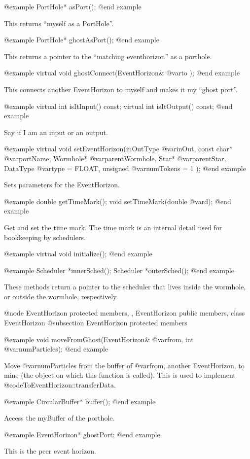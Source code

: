 @example
PortHole* asPort();
@end example

This returns ``myself as a PortHole''.

@example
PortHole* ghostAsPort();
@end example

This returns a pointer to the ``matching eventhorizon'' as a porthole.

@example
virtual void ghostConnect(EventHorizon& @var{to} );
@end example

This connects another EventHorizon to myself and makes it my ``ghost
port''.

@example
virtual int isItInput() const;
virtual int isItOutput() const;
@end example

Say if I am an input or an output.

@example
virtual void setEventHorizon(inOutType @var{inOut}, const char* @var{portName},
     Wormhole* @var{parentWormhole}, Star* @var{parentStar},
     DataType @var{type} = FLOAT, unsigned @var{numTokens} = 1 );
@end example

Sets parameters for the EventHorizon.

@example
double getTimeMark();
void setTimeMark(double @var{d});
@end example

Get and set the time mark.  The time mark is an internal detail used for
bookkeeping by schedulers.

@example
virtual void initialize();
@end example

@example
Scheduler *innerSched();
Scheduler *outerSched();
@end example

These methods return a pointer to the scheduler that lives inside the
wormhole, or outside the wormhole, respectively.

@node EventHorizon protected members,  , EventHorizon public members, class EventHorizon
@subsection EventHorizon protected members

@example
void moveFromGhost(EventHorizon& @var{from}, int @var{numParticles});
@end example

Move @var{numParticles} from the buffer of @var{from}, another
EventHorizon, to mine (the object on which this function is called).
This is used to implement @code{ToEventHorizon::transferData}.

@example
CircularBuffer* buffer();
@end example

Access the myBuffer of the porthole.

@example
EventHorizon* ghostPort;
@end example

This is the peer event horizon.

